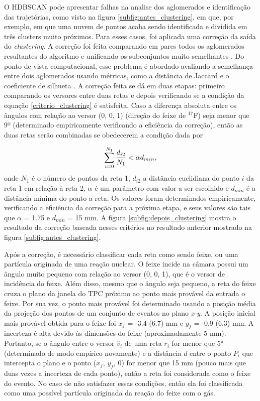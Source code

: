 \documentclass[a4paper,12pt,oneside]{book}
\begin{document}
\par O \textsc{HDBSCAN} pode apresentar falhas na analise dos aglomerados e identificação das trajetórias, como visto na figura \ref{subfig:antes_clustering}, em que, por exemplo, em que uma nuvem de pontos acaba sendo identificada e dividida em três clusters muito próximos. Para esses casos, foi aplicada uma correção da saída do \textit{clustering}. A correção foi feita comparando em pares todos os aglomerados resultantes do algoritmo e unificando os subconjuntos muito semelhantes \cite{artigo}. Do ponto de vista computacional, esse problema é abordado avaliando a semelhança entre dois aglomerados usando métricas, como a distância de Jaccard \cite{jaccard_distance} e o coeficiente de silhueta \cite{silhueta}. A correção feita se dá em duas etapas: primeiro comparando os versores entre duas retas e depois verificando se a condição da equação \ref{criterio_clustering} é satisfeita. Caso a diferença absoluta entre os ângulos com relação ao versor (0, 0, 1) (direção do feixe de $^{17}$F) seja menor que 9º (determinado empiricamente verificando a eficiência da correção), então as duas retas serão combinadas se obedecerem a condição dada por

\begin{equation}\label{criterio_clustering}
    \sum_{i = 0}^{N_1}\frac{d_{i2}}{N_1} < \alpha \space d_{min}, 
\end{equation}
%
onde $N_1$ é o número de pontos da reta 1, $d_{i2}$ a distância euclidiana do ponto $i$ da reta 1 em relação à reta 2, $\alpha$ é um parâmetro com valor a ser escolhido e $d_{min}$ é a distância mínima do ponto a reta. Os valores foram determinados empiricamente, verificando a eficiência da correção para a próxima etapa, e seus valores são tais que $\alpha$ = 1.75 e $d_{min}$ = 15 mm. A figura \ref{subfig:depois_clustering} mostra o resultado da correção baseada nesses critérios no resultado anterior mostrado na figura \ref{subfig:antes_clustering}.

\par Após a correção, é necessário classificar cada reta como sendo feixe, ou uma partícula originada de uma reação nuclear. O feixe incide na câmara possui um ângulo muito pequeno com relação ao versor (0, 0, 1), que é o versor de incidência do feixe. Além disso, mesmo que o ângulo seja pequeno, a reta do feixe cruza o plano da janela do TPC próximo ao ponto mais provável da entrada o feixe. Por sua vez, o ponto mais provável foi determinado usando a posição média da projeção dos pontos de um conjunto de eventos no plano \textit{x-y}. A posição inicial mais provável obtida para o feixe foi $x_f$ = -3.4 (6.7) mm e $y_f$ = -0.9 (6.3) mm. A incerteza é alta devido às dimensões do feixe (aproximadamente 5 mm). Portanto, se o ângulo entre o versor $\hat{v}_i$ de uma reta $r_i$ for menor que 5° (determinado de modo empírico novamente) e a distância $d$ entre o ponto $P_i$ que intercepta o plano e o ponto ($x_f$, $y_f$, 0) for menor que 15 mm (pouco mais que duas vezes a incerteza de cada ponto), então a reta foi considerada como o feixe do evento. No caso de não satisfazer essas condições, então ela foi classificada como uma possível partícula originada da reação do feixe com o gás.
\end{document}

